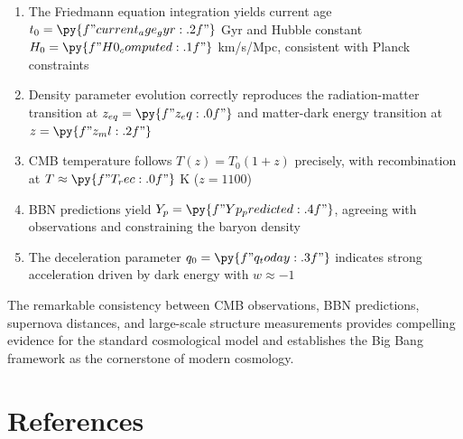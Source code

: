 \documentclass[a4paper, 11pt]{article}
\begin{document}
\begin{enumerate}
\item The Friedmann equation integration yields current age $t_0 = \py{f"{current_age_gyr:.2f}"}$ Gyr
and Hubble constant $H_0 = \py{f"{H0_computed:.1f}"}$ km/s/Mpc, consistent with Planck constraints
\item Density parameter evolution correctly reproduces the radiation-matter transition at
$z_{eq} = \py{f"{z_eq:.0f}"}$ and matter-dark energy transition at $z = \py{f"{z_ml:.2f}"}$
\item CMB temperature follows $T(z) = T_0(1+z)$ precisely, with recombination at
$T \approx \py{f"{T_rec:.0f}"}$ K ($z = 1100$)
\item BBN predictions yield $Y_p = \py{f"{Yp_predicted:.4f}"}$, agreeing with observations
and constraining the baryon density
\item The deceleration parameter $q_0 = \py{f"{q_today:.3f}"}$ indicates strong acceleration
driven by dark energy with $w \approx -1$
\end{enumerate}

The remarkable consistency between CMB observations, BBN predictions, supernova distances,
and large-scale structure measurements provides compelling evidence for the standard cosmological
model and establishes the Big Bang framework as the cornerstone of modern cosmology.

\section*{References}
\end{document}
